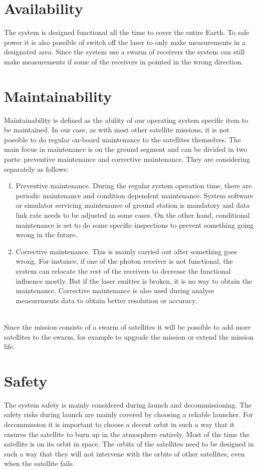 \section{Availability}
\label{blRAMSavail}
The system is designed functional all the time to cover the entire Earth. To safe power it is also possible of switch off the laser to only make measurements in a designated area. Since the system use a swarm of receivers the system can still make measurements if some of the receivers in pointed in the wrong direction.

\section{Maintainability}
\label{blRAMSmaint}
Maintainability is defined as the ability of our operating system specific item to be maintained. In our case, as with most other satellite missions, it is not possible to do regular on-board maintenance to the satellites themselves. The main focus in maintenance is on the ground segment and can be divided in two parts: preventive maintenance and corrective maintenance. They are considering separately as follows: 
	\begin{enumerate}
		\item Preventive maintenance. During the regular system operation time, there are periodic maintenance and condition dependent maintenance.  System software or simulator servicing maintenance of ground station is mandatory and data link rate needs to be adjusted in some cases. On the other hand, conditional maintenance is set to do some specific inspections to prevent something going wrong in the future.
		\item Corrective maintenance. This is mainly carried out after something goes wrong. For instance, if one of the photon receiver is not functional, the system can relocate the rest of the receivers to decrease the functional influence mostly. But if the laser emitter is broken, it is no way to obtain the maintenance. Corrective maintenance is also used during analyse measurements data to obtain better resolution or accuracy.
  	\end{enumerate}\\
Since the mission consists of a swarm of satellites it will be possible to add more satellites to the swarm, for example to upgrade the mission or extend the mission life. 

\section{Safety}
\label{blRAMSsaf} 
The system safety is mainly considered during launch and decommissioning. The safety risks during launch are mainly covered by choosing a reliable launcher. For decommission it is important to choose a decent orbit in such a way that it ensures the satellite to burn up in the atmosphere entirely. Most of the time the satellite is on its orbit in space. The orbits of the satellites need to be designed in such a way that they will not intervene with the orbits of other satellites, even when the satellite fails. 